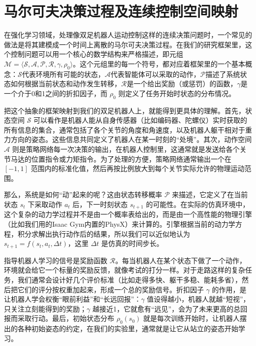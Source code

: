 \raggedbottom
\section{马尔可夫决策过程及连续控制空间映射}
在强化学习领域，处理像双足机器人运动控制这样的连续决策问题时，一个常见的做法是将其建模成一个时间上离散的马尔可夫决策过程。在我们的研究框架里，这个控制问题可以用一个核心的数学结构来严格描述，即元组 $\mathcal{M}=\langle\mathcal{S},\mathcal{A},\mathcal{P},\mathcal{R},\gamma, \rho_{0}\rangle$。这个元组里的每一个符号，都对应着框架里的一个基本概念：$\mathcal{S}$代表环境所有可能的状态，$\mathcal{A}$代表智能体可以采取的动作，$\mathcal{P}$描述了系统状态如何根据当前状态和动作发生转移，$\mathcal{R}$是一个给出奖励（或惩罚）的函数，$\gamma$是一个介于0和1之间的折扣因子，而 $\rho_{0}$ 则定义了任务开始时状态的分布情况。

把这个抽象的框架映射到我们的双足机器人上，就能得到更具体的理解。首先，状态空间 $\mathcal{S}$ 可以看作是机器人能从自身传感器（比如编码器、陀螺仪）实时获取的所有信息的集合，通常包括了各个关节的角度和角速度，以及机器人躯干相对于重力方向的姿态。这些信息共同定义了机器人在某一时刻的``处境''。其次，动作空间 $\mathcal{A}$ 则是策略网络每一次决策的输出，在机器人控制里，这通常就是发送给各个关节马达的位置指令或力矩指令。为了处理的方便，策略网络通常输出一个在 $[-1, 1]$ 范围内的标准化值，然后再按比例放大到每个关节实际允许的物理运动范围。

那么，系统是如何``动''起来的呢？这由状态转移概率 $\mathcal{P}$ 来描述，它定义了在当前状态 $s_{t}$ 下采取动作 $a_{t}$ 后，下一时刻状态 $s_{t+1}$ 的可能性。在实际的仿真环境中，这个复杂的动力学过程并不是由一个概率表给出的，而是由一个高性能的物理引擎（比如我们用的Isaac Gym内置的PhysX）来计算的。引擎根据当前的动力学方程，积分求解出执行动作后的结果，所以我们可以近似地认为 $s_{t+1} = f(s_t, a_t, \Delta t)$，这里 $\Delta t$ 是仿真的时间步长。

指导机器人学习的信号是奖励函数 $\mathcal{R}$。每当机器人在某个状态下做了一个动作，环境就会给它一个标量的奖励反馈，就像考试的打分一样。对于走路这样的复杂任务，我们通常会设计好几个评价标准（比如走得多快、躯干多稳、能耗多省），然后把它们的评分按权重加起来，形成一个总的奖励信号。折扣因子 $\gamma$ 的作用，是让机器人学会权衡``眼前利益''和``长远回报''：$\gamma$ 值设得越小，机器人就越``短视''，只关注立刻能得到的奖励；$\gamma$ 越接近1，它就愈有``远见''，会为了未来更高的总回报而采取行动。最后，初始状态分布 $\rho_{0}(s_{0})$ 就是每次训练开始时，让机器人摆出的各种初始姿态的约定，在我们的实验里，通常就是让它从站立的姿态开始学习。

